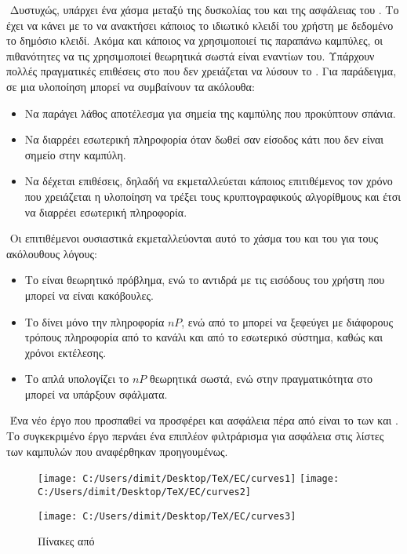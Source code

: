 \documentclass[oneside,a4paper]{article}
\begin{document}
$ $\newline
Δυστυχώς, υπάρχει ένα χάσμα μεταξύ της δυσκολίας του  και της ασφάλειας του . Το  έχει να κάνει με το να ανακτήσει κάποιος το ιδιωτικό κλειδί του  χρήστη με δεδομένο το δημόσιο κλειδί. Ακόμα και κάποιος να χρησιμοποιεί τις παραπάνω καμπύλες, οι πιθανότητες να τις χρησιμοποιεί θεωρητικά σωστά είναι εναντίων του. Υπάρχουν πολλές πραγματικές επιθέσεις στο  που δεν χρειάζεται να λύσουν το . Για παράδειγμα, σε μια υλοποίηση μπορεί να συμβαίνουν τα ακόλουθα:
\begin{itemize}
	\item Να παράγει λάθος αποτέλεσμα για σημεία της καμπύλης που προκύπτουν σπάνια.
	\item Να διαρρέει εσωτερική πληροφορία όταν δωθεί σαν είσοδος κάτι που δεν είναι σημείο στην καμπύλη.
	\item Να δέχεται  επιθέσεις, δηλαδή να εκμεταλλεύεται κάποιος επιτιθέμενος τον χρόνο που χρειάζεται η υλοποίηση να τρέξει τους κρυπτογραφικούς αλγορίθμους και έτσι να διαρρέει εσωτερική πληροφορία.
\end{itemize} 

$ $\newline
Οι επιτιθέμενοι ουσιαστικά εκμεταλλεύονται αυτό το χάσμα του  και του  για τους ακόλουθους λόγους:
\begin{itemize}
	\item Το  είναι θεωρητικό πρόβλημα, ενώ το  αντιδρά με τις εισόδους του χρήστη που μπορεί να είναι κακόβουλες.
	\item Το  δίνει μόνο την πληροφορία $nP$, ενώ από το  μπορεί να ξεφεύγει με διάφορους τρόπους πληροφορία από το κανάλι και από το εσωτερικό σύστημα, καθώς και χρόνοι εκτέλεσης.
	\item Το  απλά υπολογίζει το $nP$ θεωρητικά σωστά, ενώ στην πραγματικότητα στο  μπορεί να υπάρξουν σφάλματα.
\end{itemize}

$ $\newline
Ένα νέο έργο που προσπαθεί να προσφέρει και  ασφάλεια πέρα από  είναι το  των  και  \cite{safecurves}. Το συγκεκριμένο έργο περνάει ένα επιπλέον φιλτράρισμα για  ασφάλεια στις λίστες των καμπυλών που αναφέρθηκαν προηγουμένως.

\begin{figure}[H]
	\centering
	\texttt{[image: C:/Users/dimit/Desktop/TeX/EC/curves1]}
	\texttt{[image: C:/Users/dimit/Desktop/TeX/EC/curves2]}
\end{figure}
\begin{figure}[H]
	\centering

	\texttt{[image: C:/Users/dimit/Desktop/TeX/EC/curves3]}
	\captionsetup{labelformat=empty}
	\caption{Πίνακες από  \cite{safecurves}}
\end{figure}
\end{document}
